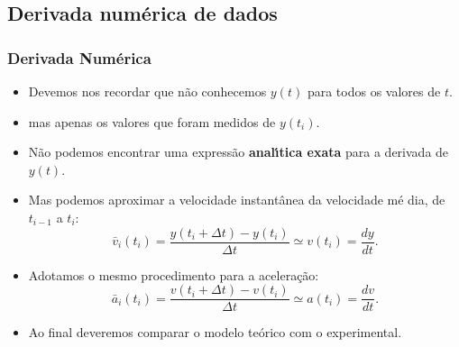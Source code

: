 \documentclass[notes=show]{beamer}
\begin{document}
\subsection{Derivada num\'{e}rica de dados}

\begin{frame}%

\frametitle{Derivada Num\'{e}rica}

\begin{itemize}
\item Devemos nos recordar que n\~{a}o conhecemos $y(t)$ para todos os
valores de $t$.

\item mas apenas os valores que foram medidos de $y(t_{i})$.

\item N\~{a}o podemos encontrar uma express\~{a}o \textbf{anal\'{\i}tica
exata} para a derivada de $y(t)$.

\item Mas podemos aproximar a velocidade instant\^{a}nea da velocidade m\'{e}%
dia, de $t_{i-1}$ a $t_{i}$:%
\[
\bar{v}_{i}\left( t_{i}\right) =\frac{y\left( t_{i}+\Delta t\right) -y\left(
t_{i}\right) }{\Delta t}\simeq v\left( t_{i}\right) =\frac{dy}{dt}.
\]

\item Adotamos o mesmo procedimento para a acelera\c{c}\~{a}o:%
\[
\bar{a}_{i}\left( t_{i}\right) =\frac{v\left( t_{i}+\Delta t\right) -v\left(
t_{i}\right) }{\Delta t}\simeq a\left( t_{i}\right) =\frac{dv}{dt}.
\]

\item Ao final deveremos comparar o modelo te\'{o}rico com o experimental.
\end{itemize}

\end{frame}%
\end{document}
